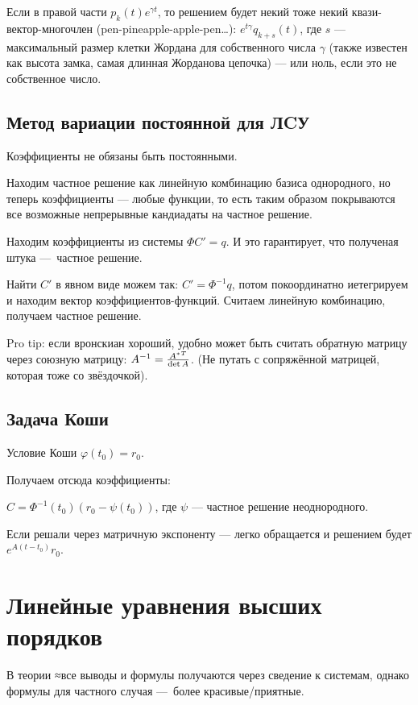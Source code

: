 \documentclass[12pt, a4paper]{article}
\begin{document}
Если в правой части $p_k(t) e^{\gamma t}$, 
то решением будет некий тоже некий квази-вектор-многочлен (pen-pineapple-apple-pen…): 
$e^{t\gamma}q_{k + s}(t)$, где $s$ — максимальный 
размер клетки Жордана для собственного числа $\gamma$ (также известен как высота замка, 
самая длинная Жорданова цепочка)
— или ноль, если это не собственное число.

\subsection{Метод вариации постоянной для ЛCУ}

Коэффициенты не обязаны быть постоянными.

Находим частное решение как линейную комбинацию базиса однородного, но теперь коэффициенты — любые функции, 
то есть таким образом покрываются все возможные непрерывные кандиадаты на частное решение.

Находим коэффициенты из системы $\Phi C' = q$. И это гарантирует, что полученая штука — частное решение.

Найти $C'$ в явном виде можем так: $C' = \Phi^{-1} q$, потом покоординатно иетегрируем и находим вектор коэффициентов-функций.
Считаем линейную комбинацию, получаем частное решение.

Pro tip: если вронскиан хороший, удобно может быть считать обратную матрицу через союзную матрицу: $A^{-1} = \frac{{A^{*}}^T}{\operatorname{det} A}$.
(Не путать с сопряжённой матрицей, которая тоже со звёздочкой).

\subsection{Задача Коши}

Условие Коши $\varphi(t_0) = r_0$.

Получаем отсюда коэффициенты:

$C = \Phi^{-1}(t_0) (r_0 - \psi(t_0))$, где $\psi$ — частное решение неоднородного.

Если решали через матричную экспоненту — легко обращается и решением будет $e^{A(t - t_0)}r_0$.

\section{Линейные уравнения высших порядков}

В теории ≈все выводы и формулы получаются через сведение к системам, 
однако формулы для частного случая — более красивые/приятные.
\end{document}
